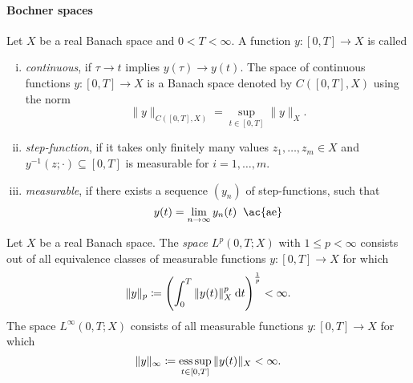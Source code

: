\documentclass[../skript.tex]{subfiles}
\begin{document}
\paragraph{Bochner spaces}
\addtocounter{dummythm}{1} %
\begin{definition} %
\label{def:c3e8}
Let $X$ be a real Banach space and $0 < T < \infty$. A function $y : [0, T] \to X$ is called
\begin{enumerate}[(i)]
\item \emph{continuous}, if $\tau \to t$ implies $y(\tau) \to y(t)$. The space of continuous functions $y : [0, T] \to X$ is a Banach space denoted by $C([0, T], X)$ using the norm
\[
	\| y \|_{C([0, T], X)} = \sup_{t \in [0, T]} \| y \|_X.
\]
\item \emph{step-function}, if it takes only finitely many values $z_1, \ldots, z_m \in X$ and \\ $y^{-1}(z; \cdot) \subseteq [0, T]$ is measurable for $i = 1, \ldots, m$.
\item \emph{measurable}, if there exists a sequence $(y_n)$ of step-functions, such that
\[
	y(t) = \lim_{n \to \infty} y_n(t) \;\; \text{\ac{ae}}
\]
\end{enumerate}
\end{definition}
\begin{definition} %
\label{def:c3e9}
Let $X$ be a real Banach space. The \emph{space $L^p(0, T; X)$} with $1 \leq p < \infty$ consists out of all equivalence classes of measurable functions $y : [0, T] \to X$ for which
\[
	\| y \|_p \coloneqq \left( \int_0^T \| y(t) \|_X^p \:\mathrm{d}t \right)^{\frac{1}{p}} < \infty.
\]
The space $L^\infty(0, T; X)$ consists of all measurable functions $y : [0, T] \to X$ for which
\[
	\| y \|_{\infty} \coloneqq \operatorname*{ess\,sup}_{t \in [0, T]} \| y(t) \|_X < \infty.
\]
\end{definition}
\end{document}
